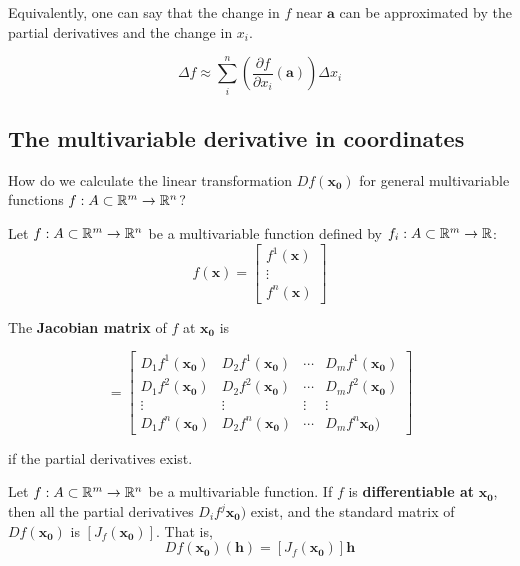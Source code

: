 Equivalently, one can say that the change in $f$ near $\bm{a}$ can be approximated by the partial derivatives and the change in $x_i$.
    
    
    $$\Delta f \approx \sum_{i}^n \left(\frac{\partial f}{\partial x_i}(\bm{a})\right)\Delta x_i$$

\subsection{The multivariable derivative in coordinates}

\begin{motivating}
    How do we calculate the linear transformation $Df(\bm{x_0})$ for general multivariable functions $f : A \subset \mathbb{R}^m \to \mathbb{R}^n$?
    \end{motivating}


\begin{definition}
    Let $f : A \subset \mathbb{R}^m \to \mathbb{R}^n$ be a multivariable function defined by $f_i  : A \subset \mathbb{R}^m \to \mathbb{R}$:
    \begin{equation*}
        f(\bm{x}) = \begin{bmatrix}
f^1(\bm{x}) \\
\vdots \\
f^n(\bm{x})
\end{bmatrix}
    \end{equation*}
    
    The \textbf{Jacobian matrix} of $f$ at $\bm{x_0}$ is 
    
    \begin{equation*}
        [J_f(\bm{x_0})] = \begin{bmatrix}
D_1f^1(\bm{x_0}) & D_2f^1(\bm{x_0}) & \cdots & D_mf^1(\bm{x_0}) \\
D_1f^2(\bm{x_0}) & D_2f^2(\bm{x_0}) & \cdots & D_mf^2(\bm{x_0}) \\
\vdots & \vdots & \vdots & \vdots\\
D_1f^n(\bm{x_0}) & D_2f^n(\bm{x_0}) & \cdots & D_mf^n\bm{x_0}) 
\end{bmatrix}
    \end{equation*}
    
    if the partial derivatives exist.
    
    \end{definition}

\begin{theorem}
    Let  $f : A \subset \mathbb{R}^m \to \mathbb{R}^n$ be a multivariable function.  If $f$ is \textbf{differentiable at} $\bm{x_0}$, then all the partial derivatives $D_if^j\bm{x_0})$ exist, and the standard matrix of $Df(\bm{x_0})$ is $[J_f(\bm{x_0})]$.  That is,
    $$Df(\bm{x_0})(\bm{h}) = [J_f(\bm{x_0})]\bm{h}$$
    
    \end{theorem}

